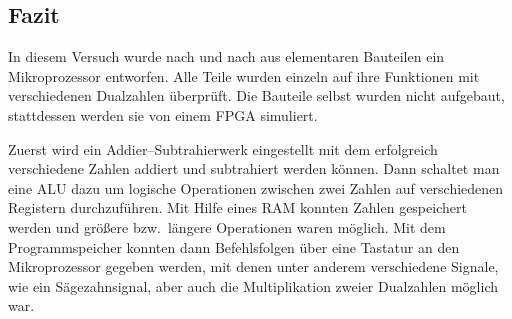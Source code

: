 \documentclass[10pt]{article}
\begin{document}
\begin{multicols}{2}
	\section{Fazit}
        In diesem Versuch wurde nach und nach aus elementaren Bauteilen ein Mikroprozessor entworfen.
        Alle Teile wurden einzeln auf ihre Funktionen mit verschiedenen Dualzahlen überprüft.
        Die Bauteile selbst wurden nicht aufgebaut, stattdessen werden sie von einem FPGA simuliert.
        \par Zuerst wird ein Addier--Subtrahierwerk eingestellt mit dem erfolgreich verschiedene Zahlen addiert und subtrahiert werden können.
        Dann schaltet man eine ALU dazu um logische Operationen zwischen zwei Zahlen auf verschiedenen Registern durchzuführen.
        Mit Hilfe eines RAM konnten Zahlen gespeichert werden und größere bzw.\ längere Operationen waren möglich.
        Mit dem Programmspeicher konnten dann Befehlsfolgen über eine Tastatur an den Mikroprozessor gegeben werden, mit denen unter anderem verschiedene Signale, wie ein Sägezahnsignal, aber auch die Multiplikation zweier Dualzahlen möglich war.
\end{multicols}
\end{document}
